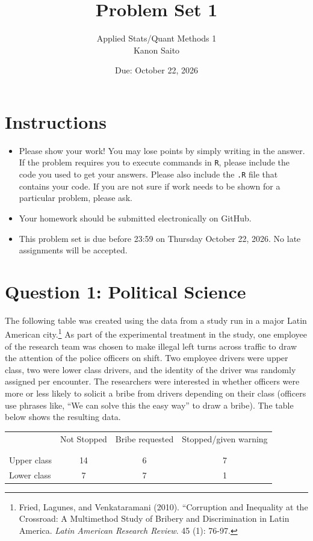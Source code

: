 \documentclass[12pt,letterpaper]{article}
\title{Problem Set 1}
\date{Due: October 22, 2026}
\author{
	Applied Stats/Quant Methods 1\\
	Kanon Saito
}
\begin{document}
	\maketitle
	\section*{Instructions}
\begin{itemize}
	\item Please show your work! You may lose points by simply writing in the answer. If the problem requires you to execute commands in \texttt{R}, please include the code you used to get your answers. Please also include the \texttt{.R} file that contains your code. If you are not sure if work needs to be shown for a particular problem, please ask.
	\item Your homework should be submitted electronically on GitHub.
	\item This problem set is due before 23:59 on Thursday October 22, 2026. No late assignments will be accepted.

\end{itemize}

	
	\vspace{.5cm}
	\section*{Question 1: Political Science}
		\vspace{.25cm}
	The following table was created using the data from a study run in a major Latin American city.\footnote{Fried, Lagunes, and Venkataramani (2010). ``Corruption and Inequality at the Crossroad: A Multimethod Study of Bribery and Discrimination in Latin America. \textit{Latin American Research Review}. 45 (1): 76-97.} As part of the experimental treatment in the study, one employee of the research team was chosen to make illegal left turns across traffic to draw the attention of the police officers on shift. Two employee drivers were upper class, two were lower class drivers, and the identity of the driver was randomly assigned per encounter. The researchers were interested in whether officers were more or less likely to solicit a bribe from drivers depending on their class (officers use phrases like, ``We can solve this the easy way'' to draw a bribe). The table below shows the resulting data.

\newpage
\begin{table}[h!]
	\centering
	\begin{tabular}{l | c c c }
		& Not Stopped & Bribe requested & Stopped/given warning \\
		\\[-1.8ex] 
		\hline \\[-1.8ex]
		Upper class & 14 & 6 & 7 \\
		Lower class & 7 & 7 & 1 \\
		\hline
	\end{tabular}
\end{table}
\end{document}
